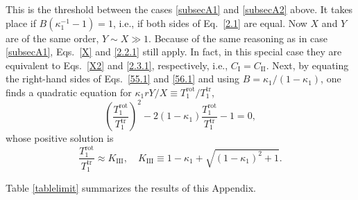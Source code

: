 \documentclass[aps,pre,reprint]{revtex4-1}
\newcommand\beq{\begin{equation}}
\newcommand\eeq{\end{equation}}
\newcommand{\tr}{{\text{tr}}}
\newcommand{\rot}{{\text{rot}}}
\begin{document}
This is the threshold between the cases \ref{subsecA1} and \ref{subsecA2} above. It takes place if $B(\kappa_1^{-1}-1)=1$, i.e., if both sides of Eq.\ \eqref{2.1} are equal. Now $X$ and $Y$ are of the same order, $Y\sim X\gg 1$.
Because of the same reasoning as in case \ref{subsecA1}, Eqs.\ \eqref{X} and \eqref{2.2.1} still apply. In fact, in this special case they are equivalent to Eqs.\ \eqref{X2} and \eqref{2.3.1}, respectively, i.e., $C_{\text{I}}=C_{\text{II}}$.
Next, by equating the right-hand sides of Eqs.\ \eqref{55.1} and \eqref{56.1} and using $B=\kappa_1/(1-\kappa_1)$, one finds a quadratic equation
for ${\kappa_1 r Y}/{X}\equiv {T_1^\rot}/{T_1^\tr}$,
\beq
\left(\frac{T_1^\rot}{T_1^\tr}\right)^2-2(1-\kappa_1)\frac{T_1^\rot}{T_1^\tr}-1=0,
\label{2.5}
\eeq
whose positive solution is
\beq
\frac{T_1^\rot}{T_1^\tr}\approx K_{\text{III}},\quad
K_{\text{III}}\equiv   1-\kappa_1+\sqrt{(1-\kappa_1)^2+1}.
\label{2.6}
\eeq

Table \ref{tablelimit} summarizes the results of this Appendix.
\end{document}
